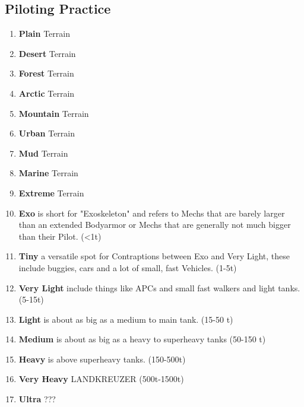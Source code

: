 \subsection{Piloting Practice}\label{subsec:piloting-practice}
\begin{enumerate}[label= -]
    \item \textbf{Plain} Terrain
    \item \textbf{Desert} Terrain
    \item \textbf{Forest} Terrain
    \item \textbf{Arctic} Terrain
    \item \textbf{Mountain} Terrain
    \item \textbf{Urban} Terrain
    \item \textbf{Mud} Terrain
    \item \textbf{Marine} Terrain
    \item \textbf{Extreme} Terrain
    \item \textbf{Exo} is short for "Exoskeleton" and refers to Mechs that are barely larger than an extended Bodyarmor
    or Mechs that are generally not much bigger than their Pilot. (<1t)
    \item \textbf{Tiny} a versatile spot for Contraptions between Exo and Very Light, these include buggies, cars and
    a lot of small, fast Vehicles. (1-5t)
    \item \textbf{Very Light} include things like APCs and small fast walkers and light tanks.(5-15t)
    \item \textbf{Light} is about as big as a medium to main tank. (15-50 t)
    \item \textbf{Medium} is about as big as a heavy to superheavy tanks (50-150 t)
    \item \textbf{Heavy} is above superheavy tanks. (150-500t)
    \item \textbf{Very Heavy} LANDKREUZER (500t-1500t)
    \item \textbf{Ultra} ???
\end{enumerate}
\par